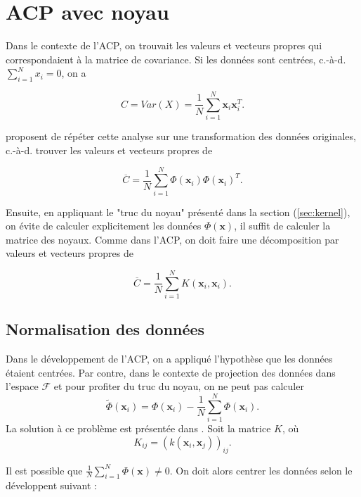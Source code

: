 \section{ACP avec noyau}

Dans le contexte de l'ACP, on trouvait les valeurs et vecteurs propres qui correspondaient à la matrice de covariance. Si les données sont centrées, c.-à-d. $\sum_{i = 1}^{N}x_i = 0$, on a 

\begin{equation*}
C = Var(X) = \frac{1}{N} \sum_{i = 1}^N \textbf{x}_i \textbf{x}_i^T.
\end{equation*}

\cite{scholkopf1997kernel} proposent de répéter cette analyse sur une transformation des données originales, c.-à-d. trouver les valeurs et vecteurs propres de

\begin{equation}\label{eq:covkernel}
\overline{C} = \frac{1}{N} \sum_{i = 1}^{N} \Phi(\textbf{x}_i)\Phi(\textbf{x}_i)^T.
\end{equation}

Ensuite, en appliquant le "truc du noyau" présenté dans la section (\ref{sec:kernel}), on évite de calculer explicitement les données $\Phi(\textbf{x})$, il suffit de calculer la matrice des noyaux. Comme dans l'ACP, on doit faire une décomposition par valeurs et vecteurs propres de 

\begin{equation}\label{eq:covkernel}
\overline{C} = \frac{1}{N} \sum_{i = 1}^{N} K(\textbf{x}_i, \textbf{x}_i).
\end{equation}

\subsection{Normalisation des données}

Dans le développement de l'ACP, on a appliqué l'hypothèse que les données étaient centrées. Par contre, dans le contexte de projection des données dans l'espace $\mathcal{F}$ et pour profiter du truc du noyau, on ne peut pas calculer $$\tilde{\Phi}(\textbf{x}_i) = \Phi(\textbf{x}_i) - \frac{1}{N}\sum_{i = 1}^{N}\Phi(\textbf{x}_i).$$ La solution à ce problème est présentée dans \cite{scholkopf1998nonlinear}. Soit la matrice $K$, où 
$$K_{ij} = (k(\textbf{x}_i, \textbf{x}_j))_{ij}.$$

Il est possible que $\frac{1}{N} \sum_{i = 1}^{N} \Phi(\textbf{x}) \neq 0$. On doit alors centrer les données selon le développent suivant : 

